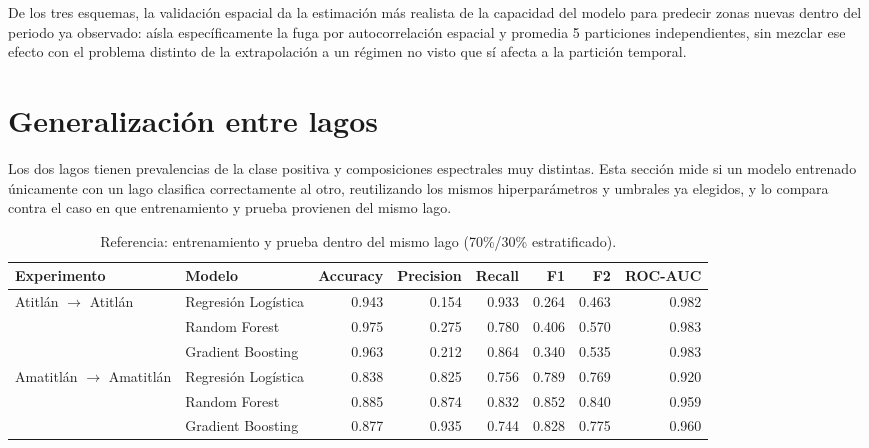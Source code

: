 \documentclass[10pt,a4paper]{article}
\begin{document}
De los tres esquemas, la validación espacial da la estimación más realista de la capacidad del modelo para predecir
zonas nuevas dentro del periodo ya observado: aísla específicamente la fuga por autocorrelación espacial y promedia
5 particiones independientes, sin mezclar ese efecto con el problema distinto de la extrapolación a un régimen no
visto que sí afecta a la partición temporal.

\section{Generalización entre lagos}

Los dos lagos tienen prevalencias de la clase positiva y composiciones espectrales muy distintas. Esta sección mide
si un modelo entrenado únicamente con un lago clasifica correctamente al otro, reutilizando los mismos
hiperparámetros y umbrales ya elegidos, y lo compara contra el caso en que entrenamiento y prueba provienen del
mismo lago.

\begin{table}[H]
  \centering
  \small
  \begin{tabular}{llrrrrrr}
    \toprule
    Experimento & Modelo & Accuracy & Precision & Recall & F1 & F2 & ROC-AUC \\
    \midrule
    \multirow{3}{*}{Atitlán $\to$ Atitlán}
      & Regresión Logística & 0.943 & 0.154 & 0.933 & 0.264 & 0.463 & 0.982 \\
      & Random Forest       & 0.975 & 0.275 & 0.780 & 0.406 & 0.570 & 0.983 \\
      & Gradient Boosting   & 0.963 & 0.212 & 0.864 & 0.340 & 0.535 & 0.983 \\
    \multirow{3}{*}{Amatitlán $\to$ Amatitlán}
      & Regresión Logística & 0.838 & 0.825 & 0.756 & 0.789 & 0.769 & 0.920 \\
      & Random Forest       & 0.885 & 0.874 & 0.832 & 0.852 & 0.840 & 0.959 \\
      & Gradient Boosting   & 0.877 & 0.935 & 0.744 & 0.828 & 0.775 & 0.960 \\
    \bottomrule
  \end{tabular}
  \caption{Referencia: entrenamiento y prueba dentro del mismo lago (70\%/30\% estratificado).}
\end{table}
\end{document}
